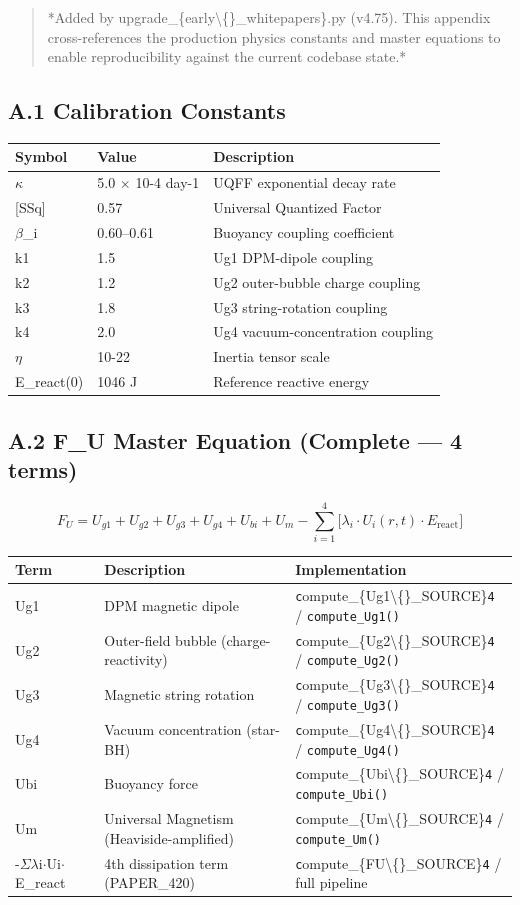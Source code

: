 \documentclass[11pt]{article}
\begin{document}
\begin{quote}
*Added by upgrade\_\{early\textbackslash\{\}\_whitepapers\}.py (v4.75). This appendix cross-references
the production physics constants and master equations to enable reproducibility
against the current codebase state.*
\end{quote}

\subsection*{A.1 Calibration Constants}

\begin{center}
\begin{longtable}{lll}
\toprule
Symbol & Value & Description \tabularnewline
\midrule
\endhead
$\kappa$ & 5.0 $\times$ 10-4 day-1 & UQFF exponential decay rate \tabularnewline
{}[SSq] & 0.57 & Universal Quantized Factor \tabularnewline
$\beta$\_i & 0.60--0.61 & Buoyancy coupling coefficient \tabularnewline
k1 & 1.5 & Ug1 DPM-dipole coupling \tabularnewline
k2 & 1.2 & Ug2 outer-bubble charge coupling \tabularnewline
k3 & 1.8 & Ug3 string-rotation coupling \tabularnewline
k4 & 2.0 & Ug4 vacuum-concentration coupling \tabularnewline
$\eta$ & 10-22 & Inertia tensor scale \tabularnewline
E\_react(0) & 1046 J & Reference reactive energy \tabularnewline
\bottomrule
\end{longtable}
\end{center}

\subsection*{A.2 F\_U Master Equation (Complete --- 4 terms)}

$$F_U = U_{g1} + U_{g2} + U_{g3} + U_{g4} + U_{bi} + U_m - \sum_{i=1}^{4}\bigl[\lambda_i \cdot U_i(r,t) \cdot E_{\mathrm{react}}\bigr]$$

\begin{center}
\begin{longtable}{lll}
\toprule
Term & Description & Implementation \tabularnewline
\midrule
\endhead
Ug1 & DPM magnetic dipole & \verb|c|ompute\_\{Ug1\textbackslash\{\}\_SOURCE\}\verb|4| / \verb|compute_Ug1()| \tabularnewline
Ug2 & Outer-field bubble (charge-reactivity) & \verb|c|ompute\_\{Ug2\textbackslash\{\}\_SOURCE\}\verb|4| / \verb|compute_Ug2()| \tabularnewline
Ug3 & Magnetic string rotation & \verb|c|ompute\_\{Ug3\textbackslash\{\}\_SOURCE\}\verb|4| / \verb|compute_Ug3()| \tabularnewline
Ug4 & Vacuum concentration (star-BH) & \verb|c|ompute\_\{Ug4\textbackslash\{\}\_SOURCE\}\verb|4| / \verb|compute_Ug4()| \tabularnewline
Ubi & Buoyancy force & \verb|c|ompute\_\{Ubi\textbackslash\{\}\_SOURCE\}\verb|4| / \verb|compute_Ubi()| \tabularnewline
Um & Universal Magnetism (Heaviside-amplified) & \verb|c|ompute\_\{Um\textbackslash\{\}\_SOURCE\}\verb|4| / \verb|compute_Um()| \tabularnewline
-$\Sigma$$\lambda$i$\cdot$Ui$\cdot$E\_react & 4th dissipation term (PAPER\_420) & \verb|c|ompute\_\{FU\textbackslash\{\}\_SOURCE\}\verb|4| / full pipeline \tabularnewline
\bottomrule
\end{longtable}
\end{center}
\end{document}

